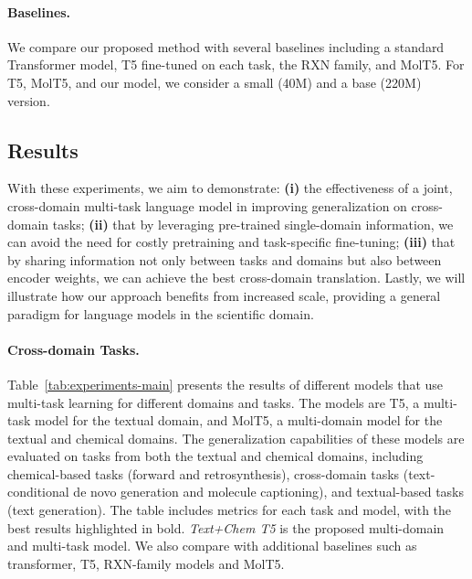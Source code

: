 \documentclass[nohyperref]{article}
\theoremstyle{plain}
\theoremstyle{definition}
\theoremstyle{remark}
\begin{document}
\paragraph{Baselines.}
We compare our proposed method with several baselines including a standard Transformer model, T5 fine-tuned on each task, the RXN family, and MolT5. For T5, MolT5, and our model, we consider a small (40M) and a base (220M) version.

\subsection{Results} 
With these experiments, we aim to demonstrate: 
\textbf{(i)} the effectiveness of a joint, cross-domain multi-task language model in improving generalization on cross-domain tasks; 
\textbf{(ii)} that by leveraging pre-trained single-domain information, we can avoid the need for costly pretraining and task-specific fine-tuning; 
\textbf{(iii)} that by sharing information not only between tasks and domains but also between encoder weights, we can achieve the best cross-domain translation. Lastly, we will illustrate how our approach benefits from increased scale, providing a general paradigm for language models in the scientific domain.

\paragraph{Cross-domain Tasks.}
Table~\ref{tab:experiments-main} presents the results of different models that use multi-task learning for different domains and tasks. The models are T5, a multi-task model for the textual domain, and MolT5, a multi-domain model for the textual and chemical domains. 
The generalization capabilities of these models are evaluated on tasks from both the textual and chemical domains, including chemical-based tasks (forward and retrosynthesis), cross-domain tasks (text-conditional de novo generation and molecule captioning), and textual-based tasks (text generation). The table includes metrics for each task and model, with the best results highlighted in bold. \textit{Text+Chem T5} is the proposed multi-domain and multi-task model.
We also compare with additional baselines such as transformer, T5, RXN-family models and MolT5.
\end{document}
